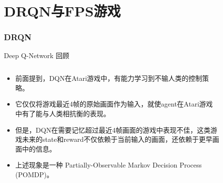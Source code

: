 \documentclass[10pt]{beamer}
\begin{document}
	\part{DRQN与FPS游戏}\label{part:fps}
	
	\section{DRQN}
	
	\begin{frame}{Deep Q-Network 回顾}
		\begin{columns}
			\begin{column}{.6\linewidth}
				\begin{itemize}
					\item 前面提到，DQN在Atari游戏中，有能力学习到不输人类的控制策略。
					\item 它仅仅将游戏最近4帧的原始画面作为输入，就使agent在Atari游戏中有了能与人类相抗衡的表现。
					\item 但是，DQN在需要记忆\alert{超过最近4帧}画面的游戏中表现不佳，这类游戏未来的state和reward不仅依赖于当前输入的画面，还依赖于更早画面中的信息。
					\item 上述现象是一种 Partially-Observable Markov Decision Process (POMDP)。
				\end{itemize}
			\end{column}
			\begin{column}{.4\linewidth}
				\begin{figure}
					\centering

\end{figure}
\end{column}
\end{columns}
\end{frame}
\end{document}
